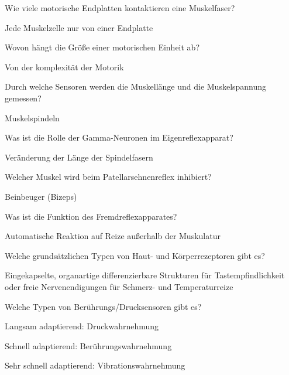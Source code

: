 \documentclass[10pt, a4paper]{exam}
\begin{document}
\begin{questions}
  \question Wie viele motorische Endplatten kontaktieren eine Muskelfaser?
  \begin{solution}
    Jede Muskelzelle nur von einer Endplatte
  \end{solution}

  \question Wovon hängt die Größe einer motorischen Einheit ab?
  \begin{solution}
    Von der komplexität der Motorik
  \end{solution}

  \question Durch welche Sensoren werden die Muskellänge und die Muskelspannung gemessen?
  \begin{solution}
    Muskelspindeln
  \end{solution}

  \question Was ist die Rolle der Gamma-Neuronen im Eigenreflexapparat?
  \begin{solution}
    Veränderung der Länge der Spindelfasern
  \end{solution}

  \question Welcher Muskel wird beim Patellarsehnenreflex inhibiert?
  \begin{solution}
    Beinbeuger (Bizeps)
  \end{solution}

  \question Was ist die Funktion des Fremdreflexapparates?
  \begin{solution}
    Automatische Reaktion auf Reize außerhalb der Muskulatur
  \end{solution}

  \question Welche grundsätzlichen Typen von Haut- und Körperrezeptoren gibt es?
  \begin{solution}
    Eingekapselte, organartige differenzierbare Strukturen für Tastempfindlichkeit oder freie Nervenendigungen für Schmerz- und Temperaturreize
  \end{solution}

  \question Welche Typen von Berührungs/Drucksensoren gibt es?
  \begin{solution}
    \begin{itemize*}
    \item Langsam adaptierend: Druckwahrnehmung
    \item Schnell adaptierend: Berührungswahrnehmung
    \item Sehr schnell adaptierend: Vibrationswahrnehmung
    \end{itemize*}
  \end{solution}


\end{questions}
\end{document}
